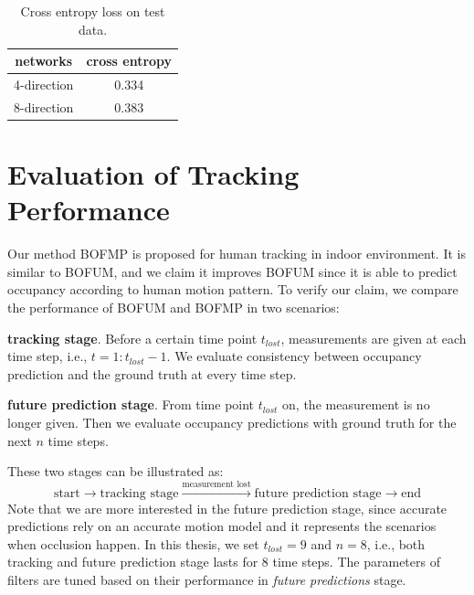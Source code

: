  \begin{table}[H]
\centering
  \begin{tabular}{c|c}
    \hline
     networks      &      cross entropy  \\ \hline
     4-direction   &      0.334 \\ \hline
     8-direction   &      0.383 \\          
   \hline
 \end{tabular}
\caption{Cross entropy loss on test data.}
\label{table:loss_on_test}
\end{table}

\section{Evaluation of Tracking Performance} \label{sec:eval_tracking}

Our method BOFMP is proposed for human tracking in indoor environment. It is similar to BOFUM, and we claim it improves BOFUM since it is able to predict occupancy according to human motion pattern. To verify our claim, we compare the performance of BOFUM and BOFMP in two scenarios:

\begin{my_enumerate}
\item \textbf{tracking stage}. Before a certain time point \( t_{lost} \), measurements are given at each time step, i.e., $t=1:t_{lost}-1$. We evaluate consistency between occupancy prediction and the ground truth at every time step.
\item \textbf{future prediction stage}. From time point \( t_{lost} \) on, the measurement is no longer given. Then we evaluate occupancy predictions with ground truth for the next \( n \) time steps.
\end{my_enumerate}

These two stages can be illustrated as:
\[\text{start} \rightarrow \text{tracking stage} \xrightarrow{\text{measurement lost}} \text{future prediction stage} \rightarrow \text{end}\]
Note that we are more interested in the future prediction stage, since accurate predictions rely on an accurate motion model and it represents the scenarios when occlusion happen. In this thesis, we set $t_{lost}=9$ and $n=8$, i.e., both tracking and future prediction stage lasts for 8 time steps. The parameters of filters are tuned based on their performance in \textit{future predictions} stage. 


